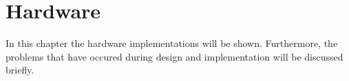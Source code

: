 \chapter{Hardware}
In this chapter the hardware implementations will be shown. Furthermore, the problems that have occured during design and implementation will be discussed briefly. 




